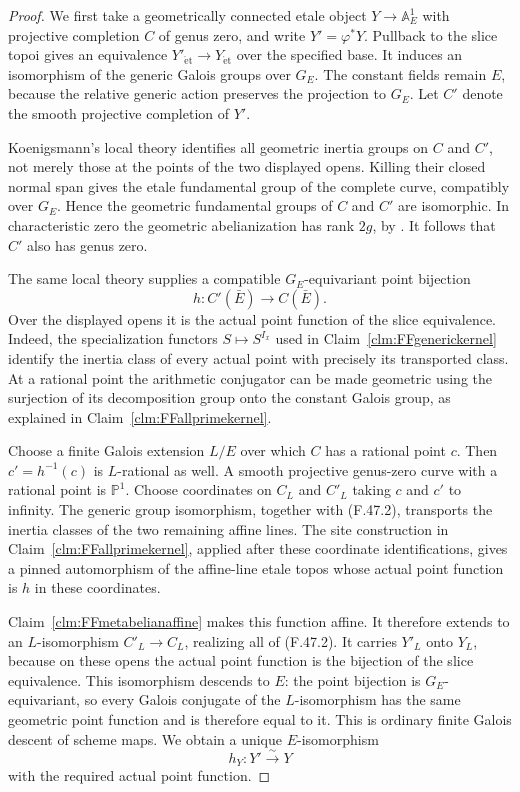 \documentclass[11pt]{article}
\begin{document}
\begin{proof}
We first take a geometrically connected etale object
\(Y\to\mathbb A^1_E\) with projective completion
\(C\) of genus zero, and write
\(Y'=\varphi^*Y\). Pullback to the slice topoi gives
an equivalence \(Y'_{\mathrm{\acute et}}\to
Y_{\mathrm{\acute et}}\) over the specified base.
It induces an isomorphism of the generic Galois groups
over \(G_E\). The constant fields remain \(E\),
because the relative generic action preserves the
projection to \(G_E\). Let \(C'\) denote the smooth
projective completion of \(Y'\).

Koenigsmann's local theory identifies all geometric
inertia groups on \(C\) and \(C'\), not merely those
at the points of the two displayed opens. Killing their
closed normal span gives the etale fundamental group of
the complete curve, compatibly over \(G_E\). Hence
the geometric fundamental groups of \(C\) and \(C'\)
are isomorphic. In characteristic zero the geometric
abelianization has rank \(2g\), by
\citet[Expos\'e~XIII, Corollary~2.12]{FF_SGA1}.
It follows that \(C'\) also has genus zero.

The same local theory supplies a compatible
\(G_E\)-equivariant point bijection
\[
                         h:C'(\bar E)\longrightarrow C(\bar E).
                                                        \tag{F.47.2}
\]
Over the displayed opens it is the actual point function
of the slice equivalence. Indeed, the specialization
functors \(S\mapsto S^{I_x}\) used in
Claim~\ref{clm:FFgenerickernel} identify the inertia
class of every actual point with precisely its transported
class. At a rational point the arithmetic conjugator can
be made geometric using the surjection of its decomposition
group onto the constant Galois group, as explained in
Claim~\ref{clm:FFallprimekernel}.

Choose a finite Galois extension \(L/E\) over which
\(C\) has a rational point \(c\). Then
\(c'=h^{-1}(c)\) is \(L\)-rational as well.
A smooth projective genus-zero curve with a rational
point is \(\mathbb P^1\). Choose coordinates on
\(C_L\) and \(C'_L\) taking \(c\) and \(c'\)
to infinity. The generic group isomorphism, together
with (F.47.2), transports the inertia classes of the
two remaining affine lines. The site construction in
Claim~\ref{clm:FFallprimekernel}, applied after these
coordinate identifications, gives a pinned automorphism
of the affine-line etale topos whose actual point function
is \(h\) in these coordinates.

Claim~\ref{clm:FFmetabelianaffine} makes this function
affine. It therefore extends to an \(L\)-isomorphism
\(C'_L\to C_L\), realizing all of (F.47.2).
It carries \(Y'_L\) onto \(Y_L\), because on these
opens the actual point function is the bijection of the
slice equivalence. This isomorphism descends to \(E\):
the point bijection is \(G_E\)-equivariant, so every
Galois conjugate of the \(L\)-isomorphism has the same
geometric point function and is therefore equal to it.
This is ordinary finite Galois descent of scheme maps.
We obtain a unique \(E\)-isomorphism
\[
                                  h_Y:Y'\xrightarrow{\sim}Y
                                                        \tag{F.47.3}
\]
with the required actual point function.


\end{proof}
\end{document}

